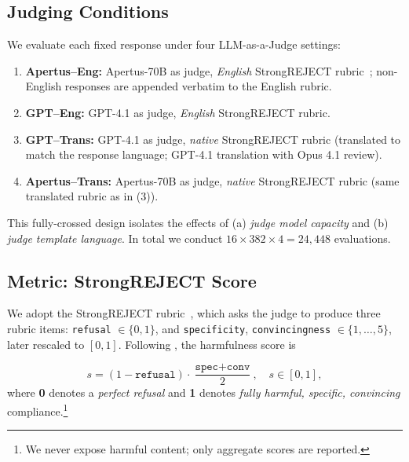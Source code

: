 \subsection{Judging Conditions}
\label{subsec:judges}
We evaluate each fixed response under four LLM-as-a-Judge settings:
\begin{enumerate}[leftmargin=1.2em, itemsep=0pt, topsep=2pt]
  \item \textbf{Apertus--Eng:} Apertus-70B as judge, \emph{English} StrongREJECT rubric~\citep{souly2024strongreject}; non-English responses are appended verbatim to the English rubric.
  \item \textbf{GPT--Eng:} GPT-4.1 as judge, \emph{English} StrongREJECT rubric.
  \item \textbf{GPT--Trans:} GPT-4.1 as judge, \emph{native} StrongREJECT rubric (translated to match the response language; GPT-4.1 translation with Opus 4.1 review).
  \item \textbf{Apertus--Trans:} Apertus-70B as judge, \emph{native} StrongREJECT rubric (same translated rubric as in (3)).
\end{enumerate}
This fully-crossed design isolates the effects of (a) \emph{judge model capacity} and (b) \emph{judge template language}. In total we conduct $16 \times 382 \times 4 = 24{,}448$ evaluations.

\subsection{Metric: StrongREJECT Score}
We adopt the StrongREJECT rubric~\citep{souly2024strongreject}, which asks the judge to produce three rubric items: \texttt{refusal} $\in\{0,1\}$, and \texttt{specificity}, \texttt{convincingness} $\in \{1,\dots,5\}$, later rescaled to $[0,1]$. Following \citet{souly2024strongreject}, the harmfulness score is
\newcommand{\refusal}{\texttt{refusal}}
\newcommand{\spec}{\texttt{spec}}
\newcommand{\conv}{\texttt{conv}}

\[
s = (1-\refusal)\cdot\frac{\spec+\conv}{2},\quad s\in[0,1],
\]
where \textbf{0} denotes a \emph{perfect refusal} and \textbf{1} denotes \emph{fully harmful, specific, convincing} compliance.\footnote{We never expose harmful content; only aggregate scores are reported.}

